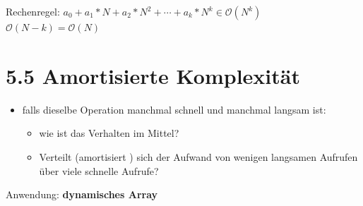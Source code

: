 \documentclass[11pt, fleqn]{scrreprt}
\begin{document}
Rechenregel: $a_0 + a_1 * N + a_2 * N^2 + \cdots + a_k * N^k \in \mathcal{O}(N^k)$ \\
	\hspace*{3cm} $\mathcal{O}(N-k) = \mathcal{O}(N)$
	
	
\section*{5.5 Amortisierte Komplexität}
\begin{itemize}
	\item falls dieselbe Operation manchmal schnell und manchmal langsam ist:
	\begin{itemize}
		\item wie ist das Verhalten im Mittel?
		\item Verteilt (\glqq amortisiert \grqq) sich der Aufwand von wenigen langsamen Aufrufen über viele schnelle Aufrufe?
	\end{itemize}
\end{itemize}
Anwendung: \textbf{dynamisches Array}
\end{document}
